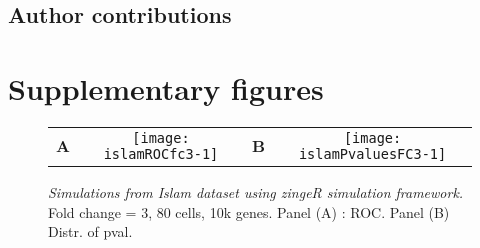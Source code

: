 \documentclass{article}
\begin{document}
\subsection*{Author contributions}

\pagebreak
\printbibliography
\appendix
\section*{Supplementary figures}

\begin{figure}[ht]
\begin{center}
\begin{tabular}{cccc}
\textbf{A} &
\texttt{[image: islamROCfc3-1]} &
\textbf{B} &
\texttt{[image: islamPvaluesFC3-1]} 
\end{tabular}
\end{center}
\caption{{\em Simulations from Islam dataset using zingeR simulation framework.} Fold change = 3, 80 cells, 10k genes. Panel (A) : ROC. Panel (B) Distr. of pval.}
\label{f:islamFC3}
\end{figure}
\end{document}
